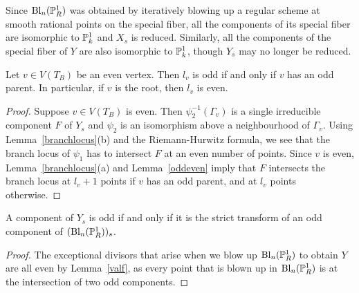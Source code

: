 Since $\mathrm{Bl}_n(\P^1_R)$ was obtained by iteratively blowing up a regular scheme at smooth rational points on the special fiber, all the components of its special fiber are isomorphic to $\P^1_{k}$ and $X_s$ is reduced. Similarly, all the components of the special fiber of $Y$ are also isomorphic to $\P^1_k$, though $Y_s$ may no longer be reduced.

\begin{lemma}\label{lmod2}
Let $v \in V(T_B)$ be an even vertex. Then $l_v$ is odd if and only if $v$ has an odd parent. In particular, if $v$ is the root, then $l_v$ is even.
\end{lemma}
\begin{proof}
Suppose $v \in V(T_B)$ is even. Then $\psi_2^{-1}(\Gamma_v)$ is a single irreducible component $F$ of $Y_s$ and $\psi_2$ is an isomorphism above a neighbourhood of $\Gamma_v$. Using Lemma~\ref{branchlocus}(b) and the Riemann-Hurwitz formula, we see that the branch locus of $\psi_1$ has to intersect $F$ at an even number of points. Since $v$ is even, Lemma~\ref{branchlocus}(a) and Lemma~\ref{oddeven} imply that $F$ intersects the branch locus at $l_v+1$ points if $v$ has an odd parent, and at $l_v$ points otherwise.
\end{proof}

\begin{lemma}\label{oddY}
 A component of $Y_s$ is odd if and only if it is the strict transform of an odd component of $(\mathrm{Bl}_n(\P^1_R))_s$.
\end{lemma}
\begin{proof}
 The exceptional divisors that arise when we blow up $\mathrm{Bl}_n(\P^1_R)$ to obtain $Y$ are all even by Lemma~\ref{valf}, as every point that is blown up in $\mathrm{Bl}_n(\P^1_R)$ is at the intersection of two odd components.
\end{proof}

